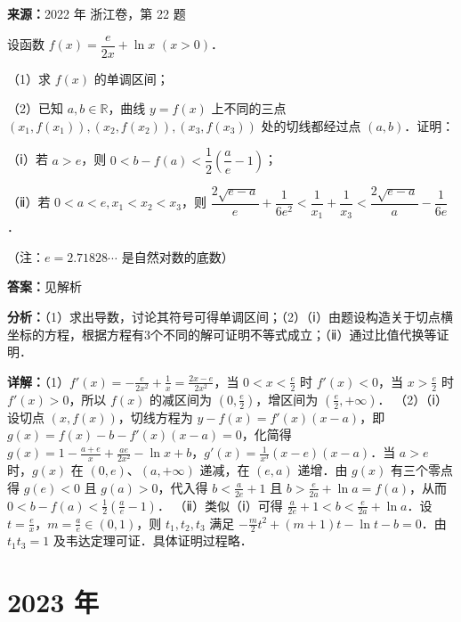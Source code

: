 \begin{question}[points=15]
\textbf{来源：}2022 年 浙江卷，第 22 题\par
设函数 $f(x) = \dfrac{e}{2x} + \ln x$ $(x>0)$．

（1）求 $f(x)$ 的单调区间；

（2）已知 $a,b \in \mathbb{R}$，曲线 $y=f(x)$ 上不同的三点 $(x_1, f(x_1)), (x_2, f(x_2)), (x_3, f(x_3))$ 处的切线都经过点 $(a,b)$．证明：

（ⅰ）若 $a>e$，则 $0 < b - f(a) < \dfrac{1}{2}\left(\dfrac{a}{e} - 1\right)$；

（ⅱ）若 $0<a<e, x_1<x_2<x_3$，则 $\dfrac{2\sqrt{e-a}}{e} + \dfrac{1}{6e^2} < \dfrac{1}{x_1} + \dfrac{1}{x_3} < \dfrac{2\sqrt{e-a}}{a} - \dfrac{1}{6e}$．

（注：$e=2.71828\cdots$ 是自然对数的底数）
\begin{solution}
\textbf{答案：}见解析

\textbf{分析：}（1）求出导数，讨论其符号可得单调区间；（2）（ⅰ）由题设构造关于切点横坐标的方程，根据方程有3个不同的解可证明不等式成立；（ⅱ）通过比值代换等证明．

\textbf{详解：}（1）$f'(x) = -\frac{e}{2x^2} + \frac{1}{x} = \frac{2x-e}{2x^2}$，当 $0<x<\frac{e}{2}$ 时 $f'(x)<0$，当 $x>\frac{e}{2}$ 时 $f'(x)>0$，所以 $f(x)$ 的减区间为 $(0,\frac{e}{2})$，增区间为 $(\frac{e}{2},+\infty)$．
（2）（ⅰ）设切点 $(x,f(x))$，切线方程为 $y-f(x)=f'(x)(x-a)$，即 $g(x)=f(x)-b-f'(x)(x-a)=0$，化简得 $g(x)=1-\frac{a+e}{x}+\frac{ae}{2x^2}-\ln x+b$，$g'(x)=\frac{1}{x^3}(x-e)(x-a)$．当 $a>e$ 时，$g(x)$ 在 $(0,e)$、$(a,+\infty)$ 递减，在 $(e,a)$ 递增．由 $g(x)$ 有三个零点得 $g(e)<0$ 且 $g(a)>0$，代入得 $b<\frac{a}{2e}+1$ 且 $b>\frac{e}{2a}+\ln a=f(a)$，从而 $0<b-f(a)<\frac{1}{2}\left(\frac{a}{e}-1\right)$．
（ⅱ）类似（ⅰ）可得 $\frac{a}{2e}+1<b<\frac{e}{2a}+\ln a$．设 $t=\frac{e}{x}$，$m=\frac{a}{e}\in(0,1)$，则 $t_1,t_2,t_3$ 满足 $-\frac{m}{2}t^2+(m+1)t-\ln t-b=0$．由 $t_1t_3=1$ 及韦达定理可证．具体证明过程略．
\end{solution}
\end{question}

\section*{2023 年}

